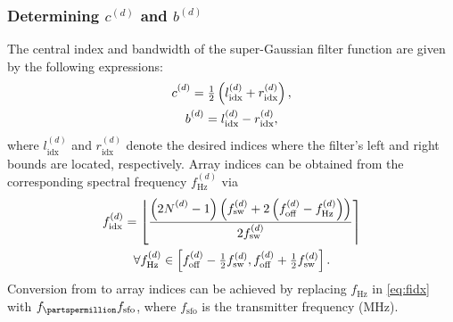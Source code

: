 \subsubsection{Determining $c^{(d)}$ and  $b^{(d)}$}
The central index and bandwidth of the super-Gaussian filter function are given by the following expressions:
\begin{subequations}
    \begin{gather}
        c_{\vphantom{\text{idx}}}^{(d)} = \tfrac{1}{2} \left(l^{(d)}_{\text{idx}} + r^{(d)}_{\text{idx}}\right), \\
        b_{\vphantom{\text{idx}}}^{(d)} = l^{(d)}_{\text{idx}} - r^{(d)}_{\text{idx}},
    \end{gather}
\end{subequations}
where $l^{(d)}_{\text{idx}}$ and $r^{(d)}_{\text{idx}}$ denote the desired
indices where the filter's left and right bounds are located, respectively.
Array indices can be obtained from the corresponding spectral frequency
$f^{(d)}_{\unit{\hertz}}$ via
\begin{equation}
    \begin{gathered}
        f_{\text{idx}}^{(d)} =
            \left \lfloor
                \frac
                {
                    \left(2 \Nd_{\vphantom{d}} - 1\right)
                    \left(\fswd + 2 \left(\foffd - f_{\unit{\hertz}}^{(d)}\right) \right)
                }
                {2 \fswd}
            \right \rceil \\
        \forall f^{(d)}_{\unit{\hertz}} \in
            \left[\foffd - \tfrac{1}{2} \fswd, \foffd + \tfrac{1}{2} \fswd\right].
        \label{eq:fidx}
    \end{gathered}
\end{equation}
Conversion from \unit{\partspermillion} to array indices can be achieved by
replacing  $f_{\unit{\hertz}}$ in \eqref{eq:fidx} with
$f_{\unit{\partspermillion}} f_{\text{sfo}}$, where $f_{\text{sfo}}$ is the
transmitter frequency (\unit{\mega \hertz}).


